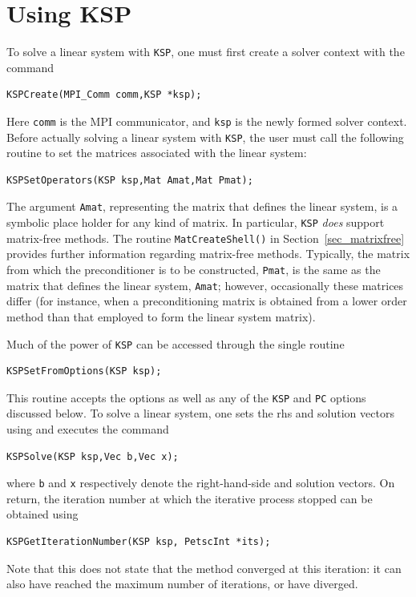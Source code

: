 \section{Using KSP}
\label{sec_usingsles}

To solve a linear system with \lstinline{KSP}, one must first create a solver context
with the command
\begin{lstlisting}
KSPCreate(MPI_Comm comm,KSP *ksp);
\end{lstlisting}
Here \lstinline{comm} is the MPI communicator, and \lstinline{ksp} is the newly
formed solver context.
Before actually solving a linear system with \lstinline{KSP}, the user must call
the following routine to set the matrices associated with the linear
system:
\begin{lstlisting}
KSPSetOperators(KSP ksp,Mat Amat,Mat Pmat);
\end{lstlisting}
The argument \lstinline{Amat}, representing the matrix that defines the
linear system, is a symbolic place holder for any kind of matrix.
In particular, \lstinline{KSP} {\em does} support matrix-free methods.
The routine \lstinline{MatCreateShell()}
in Section~\ref{sec_matrixfree} provides further information regarding
matrix-free methods.
Typically, the matrix from which the
preconditioner is to be constructed, \lstinline{Pmat}, is the same as
the matrix that defines the linear system, \lstinline{Amat}; however,
occasionally these matrices differ (for instance, 
when a preconditioning matrix is obtained from a lower order method than
that employed to form the linear system matrix).

Much of the power of \lstinline{KSP} can be accessed through the single routine
\begin{lstlisting}
KSPSetFromOptions(KSP ksp);
\end{lstlisting}
This
routine accepts the options  as well as
any of the \lstinline{KSP} and \lstinline{PC} options discussed below.
To solve a linear system, one sets the rhs and solution vectors using
and executes the
command
\begin{lstlisting}
KSPSolve(KSP ksp,Vec b,Vec x);
\end{lstlisting}
where \lstinline{b} and \lstinline{x} respectively denote the right-hand-side and
solution vectors.  On return, the iteration number at which
the iterative process stopped
can be obtained using
\begin{lstlisting}
KSPGetIterationNumber(KSP ksp, PetscInt *its);
\end{lstlisting}
Note that this does not state that the method converged at this
iteration: it can also have reached the maximum number of iterations,
or have diverged.

